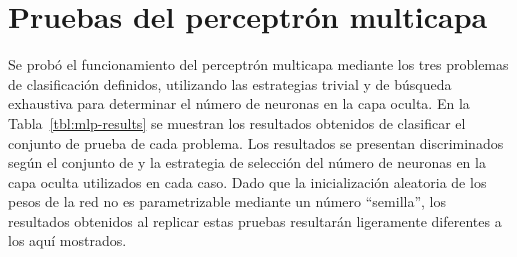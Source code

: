 %
%
%
\section{Pruebas del perceptrón multicapa}
%
Se probó el funcionamiento del perceptrón multicapa mediante los tres
problemas de clasificación definidos, utilizando las estrategias
trivial y de búsqueda exhaustiva para determinar el número de neuronas
en la capa oculta.
En la Tabla~\ref{tbl:mlp-results} se muestran los resultados obtenidos
de clasificar el conjunto de prueba de cada problema.
Los resultados se presentan discriminados según el conjunto de
 y la estrategia de selección del número de neuronas en la
capa oculta utilizados en cada caso.
Dado que la inicialización aleatoria de los pesos de la red no es
parametrizable mediante un número ``semilla'', los resultados
obtenidos al replicar estas pruebas resultarán ligeramente diferentes
a los aquí mostrados.
